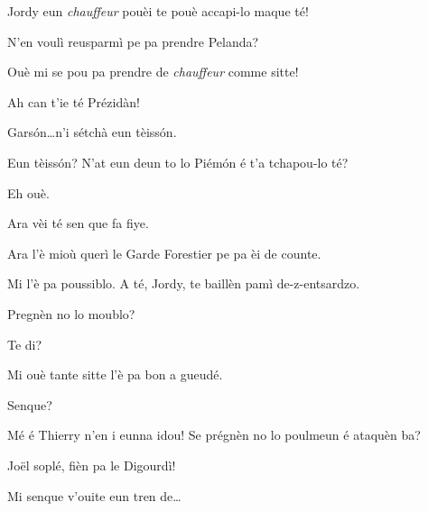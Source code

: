 \begin{drama}
\Joelspeaks Jordy eun \textit{chauffeur} pouèi te pouè accapi-lo maque té!

\Jordyspeaks N'en voulì reusparmì pe pa prendre Pelanda? 

\Joelspeaks Ouè mi se pou pa prendre de \textit{chauffeur} comme sitte!

\Thierryspeaks{} Ah can t'ie té Prézidàn!


\Chauffeurspeaks Gars\'on\ldots n'i sétchà eun tèiss\'on.

\Joelspeaks Eun tèiss\'on? N'at eun deun to lo Piém\'on é t'a tchapou-lo té?

\Chauffeurspeaks Eh ouè.

\Joelspeaks Ara vèi té sen que fa fiye.

\Chauffeurspeaks Ara l'è mioù querì le Garde Forestier pe pa èi de counte.


\Joelspeaks Mi l'è pa poussiblo. A té, Jordy, te baillèn pamì de-z-entsardzo.

\Thierryspeaks{} Pregnèn no lo moublo?

\Joelspeaks Te di?

\Thierryspeaks  Mi ouè tante sitte l'è pa bon a gueudé.

\Jordyspeaks Senque?

\Joelspeaks{} Mé é Thierry n'en i eunna idou! Se prégnèn no lo poulmeun é ataquèn ba?


\Joellespeaks{} Jo\"{e}l soplé, fièn pa le Digourdì!


\Chauffeurspeaks Mi senque v'ouite eun tren de\ldots






\end{drama}
